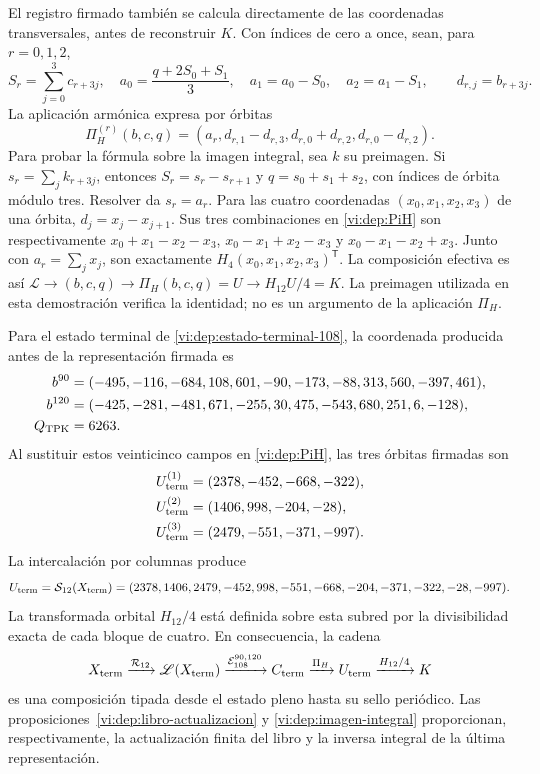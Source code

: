 El registro firmado también se calcula directamente de las coordenadas
transversales, antes de reconstruir \(K\). Con índices de cero a once,
sean, para \(r=0,1,2\),
\[
 S_r=\sum_{j=0}^3c_{r+3j},\quad
 a_0=\frac{q+2S_0+S_1}{3},\quad
 a_1=a_0-S_0,\quad a_2=a_1-S_1,
 \qquad d_{r,j}=b_{r+3j}.
\]
La aplicación armónica expresa por órbitas
\begin{equation}
 \Pi_H^{(r)}(b,c,q)=
 (a_r,d_{r,1}-d_{r,3},d_{r,0}+d_{r,2},d_{r,0}-d_{r,2}).
 \label{vi:dep:PiH}
\end{equation}
Para probar la fórmula sobre la imagen integral, sea \(k\) su
preimagen. Si \(s_r=\sum_jk_{r+3j}\), entonces
\(S_r=s_r-s_{r+1}\) y \(q=s_0+s_1+s_2\), con índices de órbita
módulo tres. Resolver da \(s_r=a_r\). Para las cuatro coordenadas
\((x_0,x_1,x_2,x_3)\) de una órbita,
\(d_j=x_j-x_{j+1}\). Sus tres combinaciones en
\eqref{vi:dep:PiH} son respectivamente
\(x_0+x_1-x_2-x_3\), \(x_0-x_1+x_2-x_3\) y
\(x_0-x_1-x_2+x_3\). Junto con \(a_r=\sum_jx_j\), son
exactamente \(H_4(x_0,x_1,x_2,x_3)^{\mathsf T}\).
La composición efectiva es así
\(\mathscr L\to(b,c,q)\to\Pi_H(b,c,q)=U\to H_{12}U/4=K\).
La preimagen utilizada en esta demostración verifica la identidad;
no es un argumento de la aplicación \(\Pi_H\).

Para el estado terminal de \eqref{vi:dep:estado-terminal-108}, la coordenada
producida antes de la representación firmada es
\begin{align}
 b^{90}={}&(-495,-116,-684,108,601,-90,
              -173,-88,313,560,-397,461),\notag\\
 b^{120}={}&(-425,-281,-481,671,-255,30,
               475,-543,680,251,6,-128),\notag\\
 Q_{\rm TPK}={}&6263.
 \label{vi:dep:canales-terminales}
\end{align}
Al sustituir estos veinticinco campos en \eqref{vi:dep:PiH}, las tres
órbitas firmadas son
\begin{align*}
 U_{\rm term}^{(1)}&=(2378,-452,-668,-322),\\
 U_{\rm term}^{(2)}&=(1406,998,-204,-28),\\
 U_{\rm term}^{(3)}&=(2479,-551,-371,-997).
\end{align*}
La intercalación por columnas produce
\begin{equation}
 U_{\rm term}=\mathcal S_{12}(X_{\rm term})
 =(2378,1406,2479,-452,998,-551,-668,-204,-371,-322,-28,-997).
 \label{vi:dep:U-terminal}
\end{equation}
La transformada orbital \(H_{12}/4\) está definida sobre esta subred por
la divisibilidad exacta de cada bloque de cuatro. En consecuencia, la cadena
\begin{equation}
 X_{\rm term}\xrightarrow{\mathcal R_{12}}\mathscr L(X_{\rm term})
 \xrightarrow{\mathcal E_{108}^{90,120}}C_{\rm term}
 \xrightarrow{\Pi_H}U_{\rm term}
 \xrightarrow{H_{12}/4}K
 \label{vi:dep:cadena-terminal-completa}
\end{equation}
es una composición tipada desde el estado pleno hasta su sello periódico.
Las proposiciones~\ref{vi:dep:libro-actualizacion} y
\ref{vi:dep:imagen-integral} proporcionan, respectivamente, la actualización
finita del libro y la inversa integral de la última representación.

